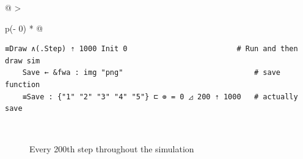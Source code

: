 \begin{longtable}[]{@{}
  >{\raggedright\arraybackslash}p{}@{}}
\caption{Running and saving (see \hyperref[vis]{{[}vis{]}}) a 1000 step
simulation (with seed 0)}\tabularnewline
\toprule\noalign{}
\endfirsthead
\endhead
\bottomrule\noalign{}
\endlastfoot
\begin{verbatim}
≡Draw ∧(.Step) ⇡ 1000 Init 0                         # Run and then draw sim
    Save ← &fwa : img "png"                              # save function
    ≡Save : {"1" "2" "3" "4" "5"} ⊏ ⊚ = 0 ◿ 200 ⇡ 1000   # actually save

\end{verbatim}
 \\
\end{longtable}

\begin{figure}
\centering
{}




\caption{Every 200th step throughout the simulation}\label{vis}
\end{figure}

